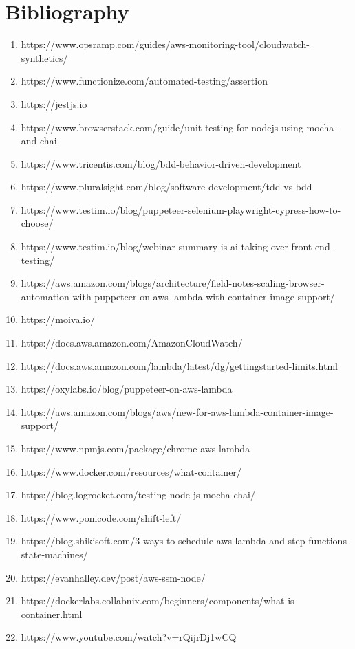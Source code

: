 \documentclass[12pt,a4paper,titlepage]{report}
\begin{document}
\chapter{Bibliography}
\begin{enumerate}
\item https://www.opsramp.com/guides/aws-monitoring-tool/cloudwatch-synthetics/
\item https://www.functionize.com/automated-testing/assertion
\item https://jestjs.io
\item https://www.browserstack.com/guide/unit-testing-for-nodejs-using-mocha-and-chai
\item https://www.tricentis.com/blog/bdd-behavior-driven-development
\item https://www.pluralsight.com/blog/software-development/tdd-vs-bdd
\item https://www.testim.io/blog/puppeteer-selenium-playwright-cypress-how-to-choose/
\item https://www.testim.io/blog/webinar-summary-is-ai-taking-over-front-end-testing/
\item https://aws.amazon.com/blogs/architecture/field-notes-scaling-browser-automation-with-puppeteer-on-aws-lambda-with-container-image-support/
\item https://moiva.io/
\item https://docs.aws.amazon.com/AmazonCloudWatch/
\item https://docs.aws.amazon.com/lambda/latest/dg/gettingstarted-limits.html
\item https://oxylabs.io/blog/puppeteer-on-aws-lambda
\item https://aws.amazon.com/blogs/aws/new-for-aws-lambda-container-image-support/
\item https://www.npmjs.com/package/chrome-aws-lambda
\item https://www.docker.com/resources/what-container/
\item https://blog.logrocket.com/testing-node-js-mocha-chai/
\item https://www.ponicode.com/shift-left/
\item https://blog.shikisoft.com/3-ways-to-schedule-aws-lambda-and-step-functions-state-machines/
\item https://evanhalley.dev/post/aws-ssm-node/
\item https://dockerlabs.collabnix.com/beginners/components/what-is-container.html
\item https://www.youtube.com/watch?v=rQijrDj1wCQ
\end{enumerate}
\end{document}
